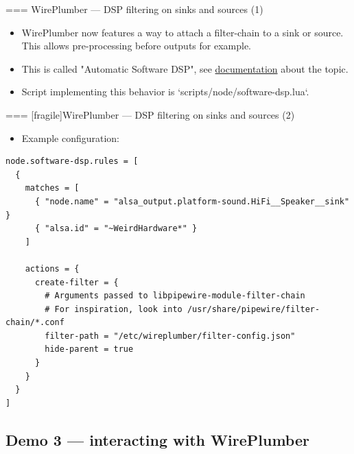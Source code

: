 === {WirePlumber — DSP filtering on sinks and sources (1)}
  \begin{itemize}

  \item WirePlumber now features a way to attach a filter-chain to a sink or
    source. This allows pre-processing before outputs for example.

  \item This is called "Automatic Software DSP", see
    \href{https://pipewire.pages.freedesktop.org/wireplumber/policies/software_dsp.html}{documentation}
    about the topic.

  \item Script implementing this behavior is `scripts/node/software-dsp.lua`.

  \end{itemize}




=== [fragile]{WirePlumber — DSP filtering on sinks and sources (2)}
  \begin{itemize}
  \item Example configuration:
  \end{itemize}

    \begin{block}{}
      \fontsize{10}{10}\selectfont
        \begin{verbatim}
node.software-dsp.rules = [
  {
    matches = [
      { "node.name" = "alsa_output.platform-sound.HiFi__Speaker__sink" }
      { "alsa.id" = "~WeirdHardware*" }
    ]

    actions = {
      create-filter = {
        # Arguments passed to libpipewire-module-filter-chain
        # For inspiration, look into /usr/share/pipewire/filter-chain/*.conf
        filter-path = "/etc/wireplumber/filter-config.json"
        hide-parent = true
      }
    }
  }
]
          \end{verbatim}
        \end{block}







\subsection{Demo 3 — interacting with WirePlumber}



